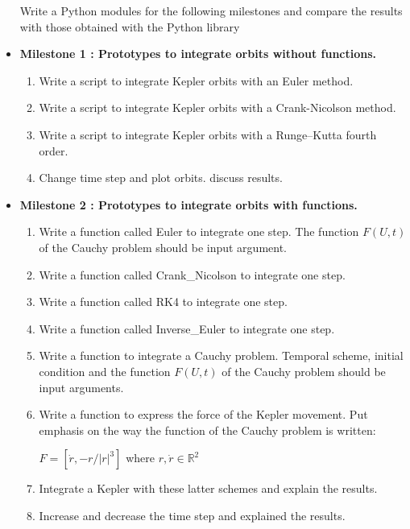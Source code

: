 \documentclass[12pt, a4paper]{article}
\begin{document}
\begin{itemize}
Write a Python modules for the following milestones and compare the results 
with those obtained with the Python library 


\item {\bf Milestone 1 : 
Prototypes to integrate orbits without functions.
  } 

\begin{enumerate} 
\item Write a script to integrate Kepler orbits with an Euler method. 
\item Write a script to integrate Kepler orbits with a Crank-Nicolson method. 
\item Write a script to integrate Kepler orbits with a Runge--Kutta fourth order.
\item Change time step and plot orbits. discuss results. 
 \end{enumerate} 



\newpage 
\item {\bf Milestone 2 : Prototypes to integrate orbits with functions. } 

\begin{enumerate} 
\item Write a function called Euler to integrate one step. 
The function  $F(U,t)$ of the Cauchy problem should be input argument.
\item Write a function called Crank\_Nicolson to integrate one step.
\item Write a function called RK4 to integrate one step.
\item Write a function called Inverse\_Euler to integrate one step.
\item Write a function to integrate a Cauchy problem. Temporal scheme, initial condition and 
the function $F(U,t)$ of the Cauchy problem should be input arguments.
\item Write a function to express the force of the Kepler movement.
Put emphasis on the way the function of the Cauchy problem is written: 

$ F = [ \dot r , -r/|r|^3 ] $ where $ r, \dot r \in \mathbb{R}^2 $ 

\item Integrate a Kepler with these latter schemes and explain the results.
\item Increase and decrease the time step and explained the results. 
 

\end{enumerate}
\end{itemize}
\end{document}
